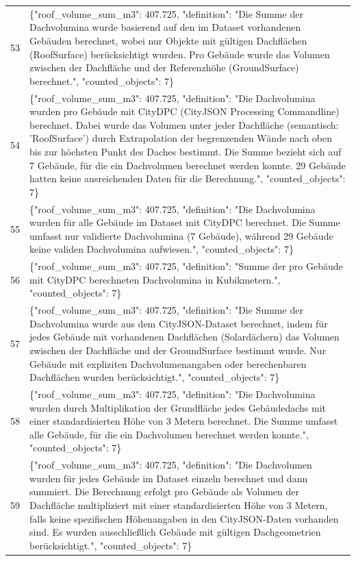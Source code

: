 \documentclass[a4paper,11pt]{article}
\begin{document}
\begin{table}[ht]
\begin{tabular}{r p{12cm}}
53 & \{"roof\_volume\_sum\_m3": 407.725, "definition": "Die Summe der Dachvolumina wurde basierend auf den im Dataset vorhandenen Gebäuden berechnet, wobei nur Objekte mit gültigen Dachflächen (RoofSurface) berücksichtigt wurden. Pro Gebäude wurde das Volumen zwischen der Dachfläche und der Referenzhöhe (GroundSurface) berechnet.", "counted\_objects": 7\} \\
54 & \{"roof\_volume\_sum\_m3": 407.725, "definition": "Die Dachvolumina wurden pro Gebäude mit CityDPC (CityJSON Processing Commandline) berechnet. Dabei wurde das Volumen unter jeder Dachfläche (semantisch: 'RoofSurface') durch Extrapolation der begrenzenden Wände nach oben bis zur höchsten Punkt des Daches bestimmt. Die Summe bezieht sich auf 7 Gebäude, für die ein Dachvolumen berechnet werden konnte. 29 Gebäude hatten keine ausreichenden Daten für die Berechnung.", "counted\_objects": 7\} \\
55 & \{"roof\_volume\_sum\_m3": 407.725, "definition": "Die Dachvolumina wurden für alle Gebäude im Dataset mit CityDPC berechnet. Die Summe umfasst nur validierte Dachvolumina (7 Gebäude), während 29 Gebäude keine validen Dachvolumina aufwiesen.", "counted\_objects": 7\} \\
56 & \{"roof\_volume\_sum\_m3": 407.725, "definition": "Summe der pro Gebäude mit CityDPC berechneten Dachvolumina in Kubikmetern.", "counted\_objects": 7\} \\
57 & \{"roof\_volume\_sum\_m3": 407.725, "definition": "Die Summe der Dachvolumina wurde aus dem CityJSON-Dataset berechnet, indem für jedes Gebäude mit vorhandenen Dachflächen (Solardächern) das Volumen zwischen der Dachfläche und der GroundSurface bestimmt wurde. Nur Gebäude mit expliziten Dachvolumenangaben oder berechenbaren Dachflächen wurden berücksichtigt.", "counted\_objects": 7\} \\
58 & \{"roof\_volume\_sum\_m3": 407.725, "definition": "Die Dachvolumina wurden durch Multiplikation der Grundfläche jedes Gebäudedachs mit einer standardisierten Höhe von 3 Metern berechnet. Die Summe umfasst alle Gebäude, für die ein Dachvolumen berechnet werden konnte.", "counted\_objects": 7\} \\
59 & \{"roof\_volume\_sum\_m3": 407.725, "definition": "Die Dachvolumen wurden für jedes Gebäude im Dataset einzeln berechnet und dann summiert. Die Berechnung erfolgt pro Gebäude als Volumen der Dachfläche multipliziert mit einer standardisierten Höhe von 3 Metern, falls keine spezifischen Höhenangaben in den CityJSON-Daten vorhanden sind. Es wurden ausschließlich Gebäude mit gültigen Dachgeometrien berücksichtigt.", "counted\_objects": 7\} \\

\end{tabular}
\end{table}
\end{document}
